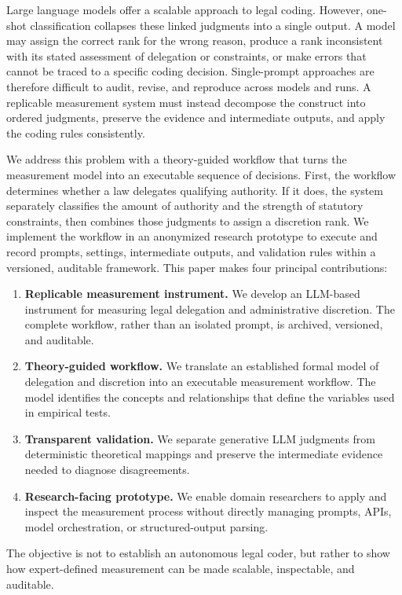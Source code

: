 \documentclass[runningheads]{llncs}
\newcommand{\systemname}{an anonymized research prototype}
\begin{document}
Large language models offer a scalable approach to legal coding. However, one-shot classification collapses these linked judgments into a single output. A model may assign the correct rank for the wrong reason, produce a rank inconsistent with its stated assessment of delegation or constraints, or make errors that cannot be traced to a specific coding decision. Single-prompt approaches are therefore difficult to audit, revise, and reproduce across models and runs. A replicable measurement system must instead decompose the construct into ordered judgments, preserve the evidence and intermediate outputs, and apply the coding rules consistently.

We address this problem with a theory-guided workflow that turns the measurement model into an executable sequence of decisions. First, the workflow determines whether a law delegates qualifying authority. If it does, the system separately classifies the amount of authority and the strength of statutory constraints, then combines those judgments to assign a discretion rank. We implement the workflow in \systemname{} to execute and record prompts, settings, intermediate outputs, and validation rules within a versioned, auditable framework. This paper makes four principal contributions:
\begin{enumerate}[nosep,leftmargin=*]
    \item \textbf{Replicable measurement instrument.} We develop an LLM-based instrument for measuring legal delegation and administrative discretion. The complete workflow, rather than an isolated prompt, is archived, versioned, and auditable.
    \item \textbf{Theory-guided workflow.} We translate an established formal model of delegation and discretion into an executable measurement workflow. The model identifies the concepts and relationships that define the variables used in empirical tests.
    \item \textbf{Transparent validation.} We separate generative LLM judgments from deterministic theoretical mappings and preserve the intermediate evidence needed to diagnose disagreements.
    \item \textbf{Research-facing prototype.} We enable domain researchers to apply and inspect the measurement process without directly managing prompts, APIs, model orchestration, or structured-output parsing.
\end{enumerate}

The objective is not to establish an autonomous legal coder, but rather to show how expert-defined measurement can be made scalable, inspectable, and auditable.
\vspace{-0.2 cm}
\end{document}
